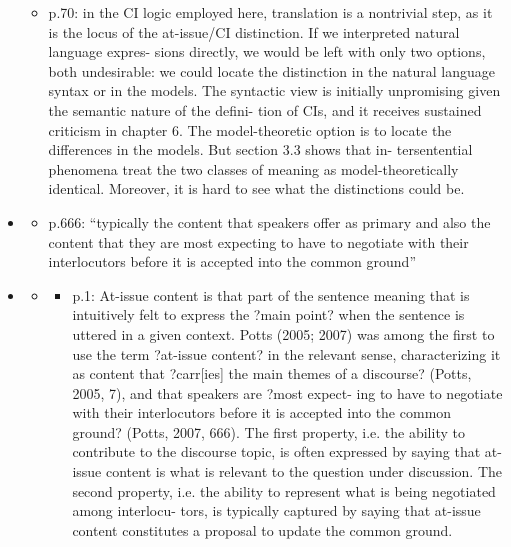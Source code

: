 \documentclass[11pt,fleqn]{article}
\newcommand{\6}{\mbox{$[\hspace*{-.6mm}[$}}
\newcommand{\9}{\mbox{$]\hspace*{-.6mm}]$}}
\begin{document}
\begin{itemize}
\begin{itemize}
\item p.70: in the CI logic employed here, translation is a nontrivial step, as it is the locus of the at-issue/CI distinction. If we interpreted natural language expres- sions directly, we would be left with only two options, both undesirable: we could locate the distinction in the natural language syntax or in the models. The syntactic view is initially unpromising given the semantic nature of the defini- tion of CIs, and it receives sustained criticism in chapter 6. The model-theoretic option is to locate the differences in the models. But section 3.3 shows that in- tersentential phenomena treat the two classes of meaning as model-theoretically identical. Moreover, it is hard to see what the distinctions could be.

\end{itemize}

\item \citealt{potts2007-compass}

\begin{itemize}

\item p.666: ``typically the content that speakers offer as primary and also the content that they are most expecting to have to negotiate with their interlocutors before it is accepted into the common ground''

\end{itemize}

\item \citealt{koev2013,koev2018,koev2021}

\begin{itemize}

\item \citealt{koev2018} 

\begin{itemize}

\item p.1: At-issue content is that part of the sentence meaning that is intuitively felt to express the ?main point? when the sentence is uttered in a given context. Potts (2005; 2007) was among the first to use the term ?at-issue content? in the relevant sense, characterizing it as content that ?carr[ies] the main themes of a discourse? (Potts, 2005, 7), and that speakers are ?most expect- ing to have to negotiate with their interlocutors before it is accepted into the common ground? (Potts, 2007, 666).  The first property, i.e. the ability to contribute to the discourse topic, is often expressed by saying that at-issue content is what is relevant to the question under discussion. The second property, i.e. the ability to represent what is being negotiated among interlocu- tors, is typically captured by saying that at-issue content constitutes a proposal to update the common ground.


\end{itemize}
\end{itemize}
\end{itemize}
\end{document}
